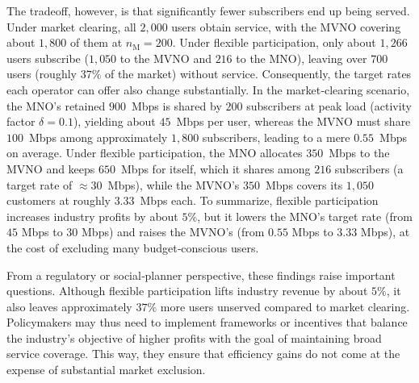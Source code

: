 \documentclass[12pt, draftclsnofoot, onecolumn]{IEEEtran}
\begin{document}
		
		The tradeoff, however, is that significantly fewer subscribers end up being served. Under market clearing, all $2{,}000$ users obtain service, with the MVNO covering about $1{,}800$ of them at \(n_{\mathrm{M}}=200\). Under flexible participation, only about $1{,}266$ users subscribe ($1{,}050$ to the MVNO and $216$ to the MNO), leaving over $700$ users (roughly $37\%$ of the market) without service. Consequently, the target rates each operator can offer also change substantially. In the market‐clearing scenario, the MNO’s retained $900$~Mbps is shared by $200$ subscribers at peak load (activity factor \(\delta = 0.1\)), yielding about $45$~Mbps per user, whereas the MVNO must share $100$~Mbps among approximately $1{,}800$ subscribers, leading to a mere $0.55$~Mbps on average. Under flexible participation, the MNO allocates $350$~Mbps to the MVNO and keeps $650$~Mbps for itself, which it shares among $216$ subscribers (a target rate of $\approx30$~Mbps), while the MVNO’s $350$~Mbps covers its $1{,}050$ customers at roughly $3.33$~Mbps each. To summarize, flexible participation increases industry profits by about \(5\%\), but it lowers the MNO's target rate (from \(45\) Mbps to \(30\) Mbps) and raises the MVNO's (from \(0.55\) Mbps to \(3.33\) Mbps), at the cost of excluding many budget‐conscious users.
		
		
		From a regulatory or social‐planner perspective, these findings raise important questions. Although flexible participation lifts industry revenue by about $5\%$, it also leaves approximately $37\%$ more users unserved compared to market clearing. Policymakers may thus need to implement frameworks or incentives that balance the industry's objective of higher profits with the goal of maintaining broad service coverage. This way, they ensure that efficiency gains do not come at the expense of substantial market exclusion.
		
		
		
		
		
		
			\vspace{-.5cm}
		
		
		
		
\end{document}
